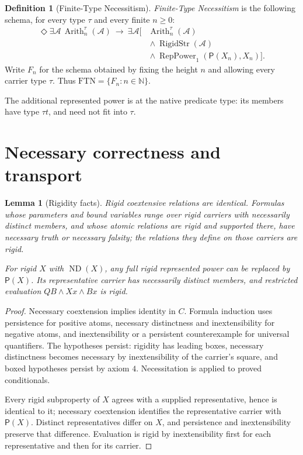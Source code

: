 \documentclass[11pt,letterpaper,numbers=noenddot]{scrartcl}
\numberwithin{equation}{section}
\newtheorem{lemma}[theorem]{Lemma}
\theoremstyle{definition}
\newtheorem{definition}[theorem]{Definition}
\newcommand{\RigidStr}{\operatorname{RigidStr}}
\newcommand{\ND}{\operatorname{ND}}
\newcommand{\Rep}{\operatorname{RepPower}_1}
\newcommand{\Arith}{\operatorname{Arith}}
\newcommand{\PP}{\mathsf P}
\newcommand{\FTN}{\mathrm{FTN}}
\begin{document}
\begin{definition}[Finite-Type Necessitism]\label{def:ftn}
\emph{Finite-Type Necessitism} is the following schema, for every type $\tau$ and every finite $n\ge0$:
\begin{equation}\label{eq:ftn}
\boxed{
\begin{aligned}
\Diamond\exists\mathcal A\,\Arith_n^\tau(\mathcal A)
\ \longrightarrow\
\exists\mathcal A\bigl[
 &\Arith_n^\tau(\mathcal A)\\
 &{}\land\RigidStr(\mathcal A)\\
 &{}\land\Rep(\PP(X_n),X_n)
\bigr].
\end{aligned}}
\end{equation}
Write $F_n$ for the schema obtained by fixing the height $n$ and allowing every carrier type $\tau$. Thus $\FTN=\{F_n:n\in\mathbb N\}$.
\end{definition}

The additional represented power is at the native predicate type: its members have type $\tau t$, and need not fit into $\tau$.

\section{Necessary correctness and transport}

\begin{lemma}[Rigidity facts]\label{lem:rigidity}
Rigid coextensive relations are identical. Formulas whose parameters and bound variables range over rigid carriers with necessarily distinct members, and whose atomic relations are rigid and supported there, have necessary truth or necessary falsity; the relations they define on those carriers are rigid.

For rigid $X$ with $\ND(X)$, any full rigid represented power can be replaced by $\PP(X)$. Its representative carrier has necessarily distinct members, and restricted evaluation $QB\land Xx\land Bx$ is rigid.
\end{lemma}

\begin{proof}
Necessary coextension implies identity in $C$. Formula induction uses persistence for positive atoms, necessary distinctness and inextensibility for negative atoms, and inextensibility or a persistent counterexample for universal quantifiers. The hypotheses persist: rigidity has leading boxes, necessary distinctness becomes necessary by inextensibility of the carrier's square, and boxed hypotheses persist by axiom $4$. Necessitation is applied to proved conditionals.

Every rigid subproperty of $X$ agrees with a supplied representative, hence is identical to it; necessary coextension identifies the representative carrier with $\PP(X)$. Distinct representatives differ on $X$, and persistence and inextensibility preserve that difference. Evaluation is rigid by inextensibility first for each representative and then for its carrier.
\end{proof}
\end{document}
